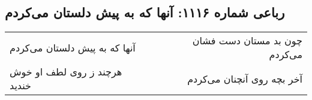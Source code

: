\begin{center}
\section*{رباعی شماره ۱۱۱۶: آنها که به پیش دلستان می‌کردم}
\label{sec:1116}
\begin{longtable}{l p{0.5cm} r}
آنها که به پیش دلستان می‌کردم
&&
چون بد مستان دست فشان می‌کردم
\\
هرچند ز روی لطف او خوش خندید
&&
آخر بچه روی آنچنان می‌کردم
\\
\end{longtable}
\end{center}
